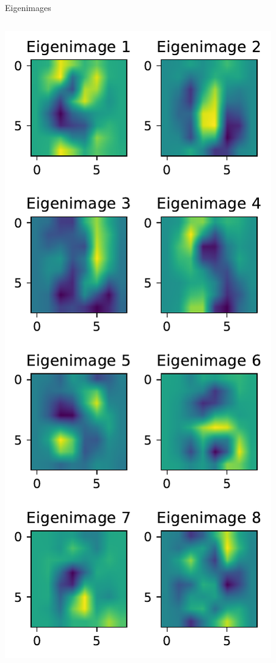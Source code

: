 \documentclass[10pt, aspectratio=169]{beamer} %
\begin{document}
\begin{frame}[fragile, allowframebreaks=0.8]{Eigenimages}
\begin{columns}
		\begin{center}
			\includegraphics[width=\columnwidth]{digits_eigenimages.pdf}
		\end{center}
		\end{columns}
\end{frame}
\end{document}
